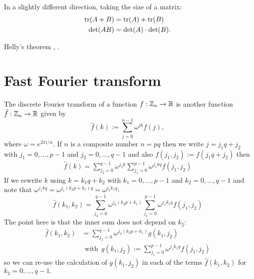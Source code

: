 \documentclass[11pt]{article}
\begin{document}
In a slightly different direction,
taking the size of a matrix:
\begin{align*}
    \mbox{tr}(A+B) &= \mbox{tr}(A) + \mbox{tr}(B) \\
    \mbox{det}(AB) &= \mbox{det}(A) \cdot \mbox{det}(B).
\end{align*}


Helly's theorem \cite{Klain1997}, \cite{Ghrist2014}.



%
%

\section{Fast Fourier transform}



The discrete Fourier transform of a function $f:\mathbb Z_n\to \mathbb R$
is another function $\hat{f}:\mathbb Z_n\to \mathbb R$ given by
$$
    \hat{f}(k) := \sum_{j=0}^{n-1} \omega^{jk}f(j),%
$$
where $\omega=e^{2\pi i/n}.$
If $n$ is a composite number $n=pq$ then we
write $j=j_1 q + j_2$ with $j_1 = 0,...,p-1$ and $j_2 = 0,...,q-1$
and also $f(j_1, j_2):=f(j_1 q + j_2)$
then
\begin{align*}
        \hat{f}(k) = \sum_{j_2=0}^{q-1} \omega^{j_2k} \sum_{j_1=0}^{p-1} \omega^{j_1kq} f(j_1,j_2) 
\end{align*}
If we rewrite $k$ using
$k=k_1 q + k_2$ with $k_1 = 0,...,p-1$ and $k_2 = 0,...,q-1$
and note that 
$\omega^{j_1kq}=\omega^{j_1(k_2p+k_1)q}=\omega^{j_1k_1q}:$
$$
        \hat{f}(k_1, k_2) = \sum_{j_2=0}^{q-1} \omega^{j_2(k_2 p+k_1)} \sum_{j_1=0}^{p-1} \omega^{j_1k_1q} f(j_1,j_2)
$$
The point here is that the inner sum does not depend on $k_2:$
\begin{align*}
        \hat{f}(k_1, k_2) &= \sum_{j_2=0}^{q-1} \omega^{j_2(k_2 p+k_1)} g(k_1, j_2) \\
        &\ \ \mathrm{with} \ \ g(k_1,j_2) := \sum_{j_1=0}^{p-1} \omega^{j_1k_1q} f(j_1,j_2)
\end{align*}
so we can re-use the calculation of $g(k_1, j_2)$ 
in each of the terms $\hat{f}(k_1, k_2)$ for $k_2=0,...,q-1.$
\end{document}
